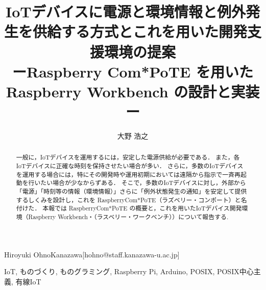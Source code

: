 \title{
  IoTデバイスに電源と環境情報と例外発生を供給する方式とこれを用いた開発支援環境の提案\\
  ーRaspberry Com*PoTE を用いた Raspberry Workbench の設計と実装ー
}



\author{大野 浩之}{Hiroyuki Ohno}{Kanazawa}[hohno@staff.kanazawa-u.ac.jp]


\begin{abstract}
 一般に，IoTデバイスを運用するには，安定した電源供給が必要である．
 また，各IoTデバイスに正確な時刻を保持させたい場合が多い．
 さらに，多数のIoTデバイスを運用する場合には，特にその開発時や運用初期においては遠隔から指示で一斉再起動を行いたい場合が少なからずある．
 そこで，多数のIoTデバイスに対し，外部から「電源」「時刻等の情報（環境情報）」さらに「例外状態発生の通知」を安定して提供するしくみを設計し，これを RaspberryCom*PoTE（ラズベリー・コンポート）と名付けた．
 本報では RaspberryCom*PoTE の概要と，これを用いたIoTデバイス開発環境（Raspberry Workbench・（ラスベリー・ワークベンチ））について報告する.



\end{abstract}

\begin{jkeyword}
IoT, ものづくり, ものグラミング, Raspberry Pi, Arduino, POSIX, POSIX中心主義, 有線IoT
\end{jkeyword}


